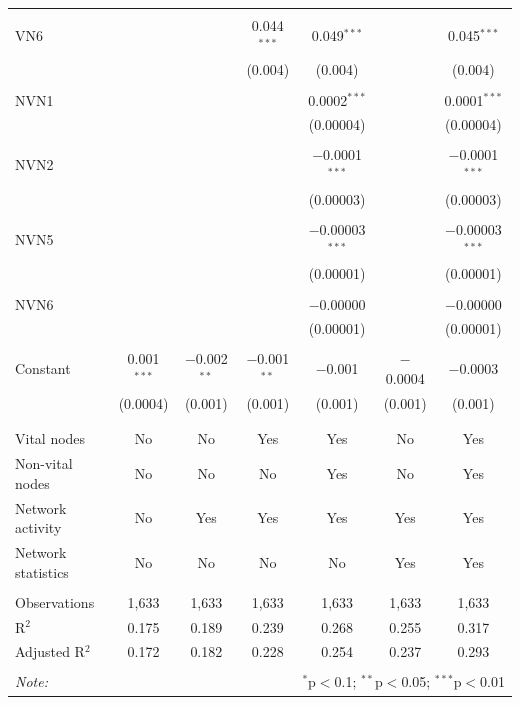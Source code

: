 \begin{table}[!htbp]
\begin{tabular}{@{\extracolsep{5pt}}lcccccc}
  & & & & & & \\ 
 VN6 &  &  & 0.044$^{***}$ & 0.049$^{***}$ &  & 0.045$^{***}$ \\ 
  &  &  & (0.004) & (0.004) &  & (0.004) \\ 
  & & & & & & \\ 
 NVN1 &  &  &  & 0.0002$^{***}$ &  & 0.0001$^{***}$ \\ 
  &  &  &  & (0.00004) &  & (0.00004) \\ 
  & & & & & & \\ 
 NVN2 &  &  &  & $-$0.0001$^{***}$ &  & $-$0.0001$^{***}$ \\ 
  &  &  &  & (0.00003) &  & (0.00003) \\ 
  & & & & & & \\ 
 NVN5 &  &  &  & $-$0.00003$^{***}$ &  & $-$0.00003$^{***}$ \\ 
  &  &  &  & (0.00001) &  & (0.00001) \\ 
  & & & & & & \\ 
 NVN6 &  &  &  & $-$0.00000 &  & $-$0.00000 \\ 
  &  &  &  & (0.00001) &  & (0.00001) \\ 
  & & & & & & \\ 
 Constant & 0.001$^{***}$ & $-$0.002$^{**}$ & $-$0.001$^{**}$ & $-$0.001 & $-$0.0004 & $-$0.0003 \\ 
  & (0.0004) & (0.001) & (0.001) & (0.001) & (0.001) & (0.001) \\ 
  & & & & & & \\ 
\hline \\[-1.8ex] 
Vital nodes & No & No & Yes & Yes & No & Yes \\ 
Non-vital nodes & No & No & No & Yes & No & Yes \\ 
Network activity & No & Yes & Yes & Yes & Yes & Yes \\ 
Network statistics & No & No & No & No & Yes & Yes \\ 
\hline &  &  &  &  &  &  \\ 
Observations & 1,633 & 1,633 & 1,633 & 1,633 & 1,633 & 1,633 \\ 
R$^{2}$ & 0.175 & 0.189 & 0.239 & 0.268 & 0.255 & 0.317 \\ 
Adjusted R$^{2}$ & 0.172 & 0.182 & 0.228 & 0.254 & 0.237 & 0.293 \\ 
\hline 
\hline \\[-1.8ex] 
\textit{Note:}  & \multicolumn{6}{r}{$^{*}$p$<$0.1; $^{**}$p$<$0.05; $^{***}$p$<$0.01} \\ 
\end{tabular} 
\end{table} 
